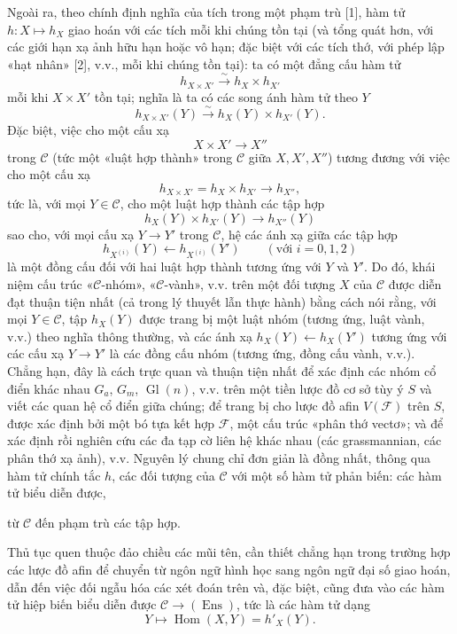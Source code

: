 \documentclass[11pt,twoside,openany]{book}
\numberwithin{equation}{section}
\newcommand{\src}[1]{%
  \phantomsection\hypertarget{src:\fgasourceid:#1}{}%
  \marginpar{\raggedleft\footnotesize\sffamily #1}%
}
\newcommand{\fgasourceid}{unset}
\begin{document}
\src{370}
Ngoài ra, theo chính định nghĩa của tích trong một phạm trù [1], hàm tử
$h:X\longmapsto h_X$ giao hoán với các tích mỗi khi chúng tồn tại (và tổng
quát hơn, với các giới hạn xạ ảnh hữu hạn hoặc vô hạn; đặc biệt với các tích
thớ, với phép lập «hạt nhân» [2], v.v., mỗi khi chúng tồn tại): ta có một
đẳng cấu hàm tử
\[
  h_{X\times X'}\xrightarrow{\sim}h_X\times h_{X'}
\]
mỗi khi $X\times X'$ tồn tại; nghĩa là ta có các song ánh hàm tử theo $Y$
\[
  h_{X\times X'}(Y)\xrightarrow{\sim}h_X(Y)\times h_{X'}(Y).
\]
Đặc biệt, việc cho một cấu xạ
\[
  X\times X'\longrightarrow X''
\]
trong $\mathcal C$ (tức một «luật hợp thành» trong $\mathcal C$ giữa
$X,X',X''$) tương đương với việc cho một cấu xạ
\[
  h_{X\times X'}=h_X\times h_{X'}\longrightarrow h_{X''},
\]
tức là, với mọi $Y\in\mathcal C$, cho một luật hợp thành các tập hợp
\[
  h_X(Y)\times h_{X'}(Y)\longrightarrow h_{X''}(Y)
\]
sao cho, với mọi cấu xạ $Y\longrightarrow Y'$ trong $\mathcal C$, hệ các ánh
xạ giữa các tập hợp
\[
  h_{X^{(i)}}(Y)\longleftarrow h_{X^{(i)}}(Y')
  \qquad(\text{với }i=0,1,2)
\]
là một đồng cấu đối với hai luật hợp thành tương ứng với $Y$ và $Y'$. Do đó,
khái niệm cấu trúc «$\mathcal C$-nhóm», «$\mathcal C$-vành», v.v. trên một
đối tượng $X$ của $\mathcal C$ được diễn đạt thuận tiện nhất (cả trong lý
thuyết lẫn thực hành) bằng cách nói rằng, với mọi $Y\in\mathcal C$, tập
$h_X(Y)$ được trang bị một luật nhóm (tương ứng, luật vành, v.v.) theo nghĩa
thông thường, và các ánh xạ
$h_X(Y)\longleftarrow h_X(Y')$ tương ứng với các cấu xạ
$Y\longrightarrow Y'$ là các đồng cấu nhóm (tương ứng, đồng cấu vành, v.v.).
Chẳng hạn, đây là cách trực quan và thuận tiện nhất để xác định các nhóm cổ
điển khác nhau $G_a$, $G_m$, $\operatorname{Gl}(n)$, v.v. trên một tiền lược
đồ cơ sở tùy ý $S$ và viết các quan hệ cổ điển giữa chúng; để trang bị cho
lược đồ afin $V(\mathcal F)$ trên $S$, được xác định bởi một bó tựa kết hợp
$\mathcal F$, một cấu trúc «phân thớ vectơ»; và để xác định rồi nghiên cứu
các đa tạp cờ liên hệ khác nhau (các grassmannian, các phân thớ xạ ảnh),
v.v. Nguyên lý chung chỉ đơn giản là đồng nhất, thông qua hàm tử chính tắc
$h$, các đối tượng của $\mathcal C$ với một số hàm tử phản biến: các hàm tử
biểu diễn được,

\src{371}
từ $\mathcal C$ đến phạm trù các tập hợp.

Thủ tục quen thuộc đảo chiều các mũi tên, cần thiết chẳng hạn trong trường hợp
các lược đồ afin để chuyển từ ngôn ngữ hình học sang ngôn ngữ đại số giao
hoán, dẫn đến việc đối ngẫu hóa các xét đoán trên và, đặc biệt, cũng đưa vào
các hàm tử hiệp biến biểu diễn được
$\mathcal C\longrightarrow(\operatorname{Ens})$, tức là các hàm tử dạng
\[
  Y\longmapsto\operatorname{Hom}(X,Y)=h'_X(Y).
\]
\end{document}
